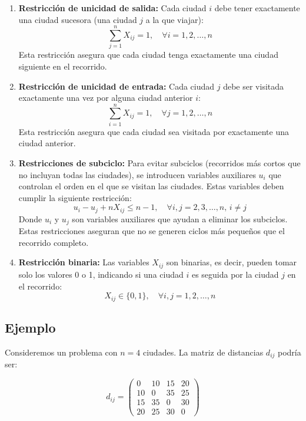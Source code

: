 \documentclass[12pt,titlepage,twoside,openright]{book}
\begin{document}
\begin{enumerate}
	\item \textbf{Restricción de unicidad de salida:} Cada ciudad $i$ debe tener exactamente una ciudad sucesora (una ciudad $j$ a la que viajar):
	      \[
		      \sum_{j=1}^{n} X_{ij} = 1, \quad \forall i = 1, 2, \dots, n
	      \]
	      Esta restricción asegura que cada ciudad tenga exactamente una ciudad siguiente en el recorrido.

	\item \textbf{Restricción de unicidad de entrada:} Cada ciudad $j$ debe ser visitada exactamente una vez por alguna ciudad anterior $i$:
	      \[
		      \sum_{i=1}^{n} X_{ij} = 1, \quad \forall j = 1, 2, \dots, n
	      \]
	      Esta restricción asegura que cada ciudad sea visitada por exactamente una ciudad anterior.

	\item \textbf{Restricciones de subciclo:} Para evitar subciclos (recorridos más cortos que no incluyan todas las ciudades), se introducen variables auxiliares $u_i$ que controlan el orden en el que se visitan las ciudades. Estas variables deben cumplir la siguiente restricción:
	      \[
		      u_i - u_j + n X_{ij} \leq n - 1, \quad \forall i, j = 2, 3, \dots, n, \, i \neq j
	      \]
	      Donde $u_i$ y $u_j$ son variables auxiliares que ayudan a eliminar los subciclos. Estas restricciones aseguran que no se generen ciclos más pequeños que el recorrido completo.

	\item \textbf{Restricción binaria:} Las variables $X_{ij}$ son binarias, es decir, pueden tomar solo los valores 0 o 1, indicando si una ciudad $i$ es seguida por la ciudad $j$ en el recorrido:
	      \[
		      X_{ij} \in \{0,1\}, \quad \forall i,j = 1, 2, \dots, n
	      \]
\end{enumerate}

\subsection{Ejemplo}

Consideremos un problema con $n = 4$ ciudades. La matriz de distancias $d_{ij}$ podría ser:

\[
	d_{ij} =
	\begin{pmatrix}
		0  & 10 & 15 & 20 \\
		10 & 0  & 35 & 25 \\
		15 & 35 & 0  & 30 \\
		20 & 25 & 30 & 0
	\end{pmatrix}
\]
\end{document}
